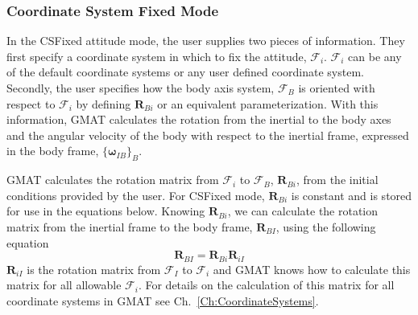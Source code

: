 \subsubsection{Coordinate System Fixed Mode}

In the CSFixed attitude mode, the user supplies two pieces of
information. They first specify a coordinate  system in which to fix
the attitude, $\mathcal{F}_i$.  $\mathcal{F}_i$ can be any of the
default coordinate systems or any user defined coordinate system.
Secondly, the user specifies how the body axis system,
$\mathcal{F}_B$ is oriented with respect to $\mathcal{F}_i$ by
defining $\mathbf{R}_{Bi}$ or an equivalent parameterization. With
this information, GMAT calculates the rotation from the inertial to
the body axes and the angular velocity of the body with respect to
the inertial frame, expressed in the body frame,
$\{\mathbf{\boldsymbol\omega}_{IB}\}_B$.

GMAT calculates the rotation matrix from $\mathcal{F}_i$  to
$\mathcal{F}_B$, $\mathbf{R}_{Bi}$, from the initial conditions
provided by the user.  For CSFixed mode, $\mathbf{R}_{Bi}$ is
constant and is stored for use in the equations below.  Knowing
$\mathbf{R}_{Bi}$, we can calculate the rotation matrix from the
inertial frame to the body frame, $\mathbf{R}_{BI}$, using the
following equation
%
\begin{equation}
     \mathbf{R}_{BI} = \mathbf{R}_{Bi}\mathbf{R}_{iI}
     \label{Eq:CSFixedRotationMatrix}
\end{equation}
%
$\mathbf{R}_{iI}$ is the rotation matrix from $\mathcal{F}_I$ to
$\mathcal{F}_i$ and GMAT knows how to calculate this matrix for all
allowable $\mathcal{F}_i$.  For details on the calculation of this
matrix for all coordinate systems in GMAT  see
Ch.~\ref{Ch:CoordinateSystems}.

